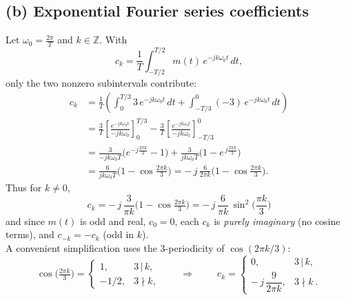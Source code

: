 \documentclass[11pt]{article}
\begin{document}
\subsection*{(b) Exponential Fourier series coefficients}
Let $\omega_0=\tfrac{2\pi}{T}$ and $k\in\mathbb{Z}$. With
\[
c_k=\frac{1}{T}\int_{-T/2}^{T/2} m(t)\,e^{-j k\omega_0 t}\,dt,
\]
only the two nonzero subintervals contribute:
\begin{align*}
c_k
&=\frac{1}{T}\!\left(\int_{0}^{T/3} 3\,e^{-j k\omega_0 t}\,dt
+\int_{-T/3}^{0} (-3)\,e^{-j k\omega_0 t}\,dt\right)\\
&=\frac{3}{T}\left[\frac{e^{-jk\omega_0 t}}{-j k\omega_0}\right]_{0}^{T/3}
-\frac{3}{T}\left[\frac{e^{-jk\omega_0 t}}{-j k\omega_0}\right]_{-T/3}^{0}\\
&=\frac{3}{-j k\omega_0 T}\Big(e^{-j\frac{2\pi k}{3}}-1\Big)
+\frac{3}{j k\omega_0 T}\Big(1-e^{\,j\frac{2\pi k}{3}}\Big)\\
&=\frac{6}{j k\omega_0 T}\Big(1-\cos\tfrac{2\pi k}{3}\Big)
= -\,j\,\frac{6}{2\pi k}\Big(1-\cos\tfrac{2\pi k}{3}\Big).
\end{align*}
Thus for $k\neq 0$,
\[
\boxed{\; c_k = -\,j\,\frac{3}{\pi k}\Big(1-\cos\tfrac{2\pi k}{3}\Big)
= -\,j\,\frac{6}{\pi k}\,\sin^2\!\Big(\frac{\pi k}{3}\Big)\;}
\]
and since $m(t)$ is odd and real, $\boxed{c_0=0}$, each $c_k$ is \emph{purely imaginary} (no cosine terms), and $c_{-k}=-c_k$ (odd in $k$).\\
A convenient simplification uses the $3$-periodicity of $\cos(2\pi k/3)$:
\[
\cos\!\Big(\tfrac{2\pi k}{3}\Big)=
\begin{cases}
1, & 3\,|\,k,\\[2pt]
-1/2, & 3\nmid k,
\end{cases}
\qquad\Rightarrow\qquad
\boxed{\;c_k=
\begin{cases}
0, & 3\,|\,k,\\[2pt]
-\,j\,\dfrac{9}{2\pi k}, & 3\nmid k~.
\end{cases}}
\]
\end{document}
